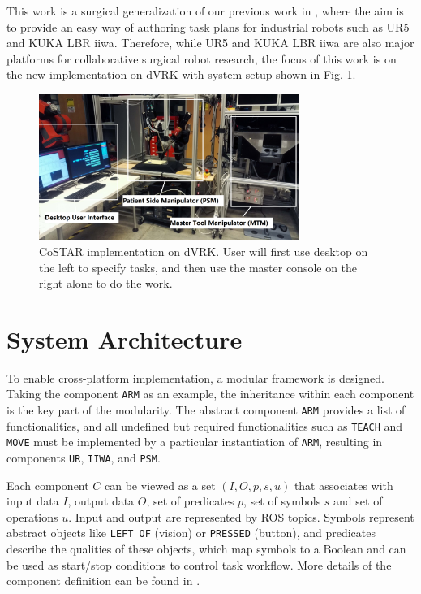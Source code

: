 \documentclass[letterpaper, 10 pt, conference]{ieeeconf}
\begin{document}

This work is a surgical generalization of our previous work in \cite{paxton2017costar}, where the aim is to provide an easy way of authoring task plans for industrial robots such as UR5 and KUKA LBR iiwa. Therefore, while UR5 and KUKA LBR iiwa are also major platforms for collaborative surgical robot research, the focus of this work is on the new implementation on dVRK with system setup shown in Fig. \ref{fig:dvrk}. 


\begin{figure}[bt]
\centering
\includegraphics[width=240pt]{dvrk.png}
\caption{CoSTAR implementation on dVRK. User will first use desktop on the left to specify tasks, and then use the master console on the right alone to do the work.}
\label{fig:dvrk}
\end{figure}


\section{System Architecture}
To enable cross-platform implementation, a modular framework is designed. Taking the component \texttt{ARM} as an example, the inheritance within each component is the key part of the modularity. The abstract component \texttt{ARM} provides a list of functionalities, and all undefined but required functionalities such as \texttt{TEACH} and \texttt{MOVE} must be implemented by a particular instantiation of \texttt{ARM}, resulting in components \texttt{UR}, \texttt{IIWA}, and \texttt{PSM}. 

Each component $C$ can be viewed as a set $(I,O,p,s,u)$ that associates with input data $I$, output data $O$, set of predicates $p$, set of symbols $s$ and set of operations $u$. Input and output are represented by ROS topics. Symbols represent abstract objects like \texttt{LEFT OF} (vision) or \texttt{PRESSED} (button), and predicates describe the qualities of these objects, which map symbols to a Boolean and can be used as start/stop conditions to control task workflow. More details of the component definition can be found in \cite{paxton2017costar}.
\end{document}
